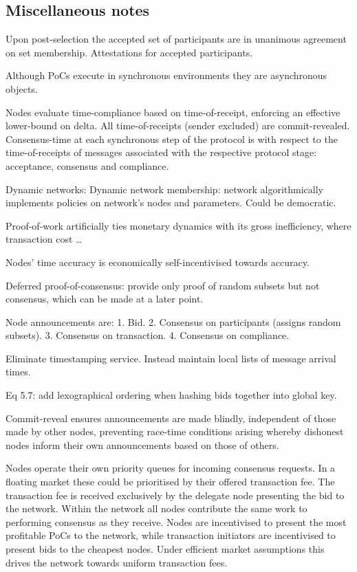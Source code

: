 \subsection{Miscellaneous notes}

Upon post-selection the accepted set of participants are in unanimous agreement on set membership.
Attestations for accepted participants.

Although PoCs execute in synchronous environments they are asynchronous objects.

Nodes evaluate time-compliance based on time-of-receipt, enforcing an effective lower-bound on delta. All time-of-receipts (sender excluded) are commit-revealed. Consensus-time at each synchronous step of the protocol is with respect to the time-of-receipts of messages associated with the respective protocol stage: acceptance, consensus and compliance.

Dynamic networks: Dynamic network membership: network algorithmically implements policies on network’s nodes and parameters. Could be democratic.

Proof-of-work artificially ties monetary dynamics with its gross inefficiency, where transaction cost …

Nodes' time accuracy is economically self-incentivised towards accuracy.

Deferred proof-of-consensus: provide only proof of random subsets but not consensus, which can be made at a later point.

Node announcements are:
1. Bid.
2. Consensus on participants (assigns random subsets).
3. Consensus on transaction.
4. Consensus on compliance.

Eliminate timestamping service. Instead maintain local lists of message arrival times.

Eq 5.7: add lexographical ordering when hashing bids together into global key.

Commit-reveal ensures announcements are made blindly, independent of those made by other nodes, preventing race-time conditions arising whereby dishonest nodes inform their own announcements based on those of others.

Nodes operate their own priority queues for incoming consensus requests. In a floating market these could be prioritised by their offered transaction fee. The transaction fee is received exclusively by the delegate node presenting the bid to the network. Within the network all nodes contribute the same work to performing consensus as they receive. Nodes are incentivised to present the most profitable PoCs to the network, while transaction initiators are incentivised to present bids to the cheapest nodes. Under efficient market assumptions this drives the network towards uniform transaction fees.

